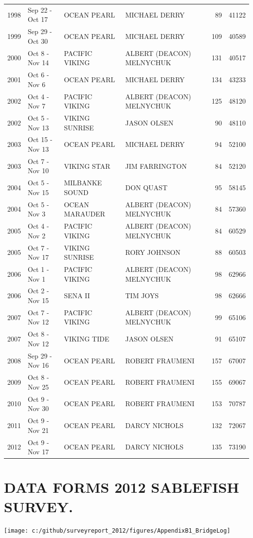 \documentclass[12pt]{article}\usepackage[]{graphicx}\usepackage[]{color}
\begin{document}
\begin{appendices}
\begin{longtable}{rlllrr}
1998 & Sep 22  - Oct 17 & OCEAN PEARL & MICHAEL DERRY & 89 & 41122\\
1999 & Sep 29  - Oct 30 & OCEAN PEARL & MICHAEL DERRY & 109 & 40589\\
2000 & Oct  8  - Nov 14 & PACIFIC VIKING & ALBERT (DEACON) MELNYCHUK & 131 & 40517\\
2001 & Oct  6  - Nov  6 & OCEAN PEARL & MICHAEL DERRY & 134 & 43233\\
2002 & Oct  4  - Nov  7 & PACIFIC VIKING & ALBERT (DEACON) MELNYCHUK & 125 & 48120\\
2002 & Oct  5  - Nov 13 & VIKING SUNRISE & JASON OLSEN & 90 & 48110\\
2003 & Oct 15  - Nov 13 & OCEAN PEARL & MICHAEL DERRY & 94 & 52100\\
2003 & Oct  7  - Nov 10 & VIKING STAR & JIM FARRINGTON & 84 & 52120\\
2004 & Oct  5  - Nov 15 & MILBANKE SOUND & DON QUAST & 95 & 58145\\
2004 & Oct  5  - Nov  3 & OCEAN MARAUDER & ALBERT (DEACON) MELNYCHUK & 84 & 57360\\
2005 & Oct  4  - Nov  2 & PACIFIC VIKING & ALBERT (DEACON) MELNYCHUK & 84 & 60529\\
2005 & Oct  7  - Nov 17 & VIKING SUNRISE & RORY JOHNSON & 88 & 60503\\
2006 & Oct  1  - Nov  1 & PACIFIC VIKING & ALBERT (DEACON) MELNYCHUK & 98 & 62966\\
2006 & Oct  2  - Nov 15 & SENA II & TIM JOYS & 98 & 62666\\
2007 & Oct  7  - Nov 12 & PACIFIC VIKING & ALBERT (DEACON) MELNYCHUK & 99 & 65106\\
2007 & Oct  8  - Nov 12 & VIKING TIDE & JASON OLSEN & 91 & 65107\\
2008 & Sep 29  - Nov 16 & OCEAN PEARL & ROBERT FRAUMENI & 157 & 67007\\
2009 & Oct  8  - Nov 25 & OCEAN PEARL & ROBERT FRAUMENI & 155 & 69067\\
2010 & Oct  9  - Nov 30 & OCEAN PEARL & ROBERT FRAUMENI & 153 & 70787\\
2011 & Oct  9  - Nov 21 & OCEAN PEARL & DARCY NICHOLS & 132 & 72067\\
2012 & Oct  9  - Nov 17 & OCEAN PEARL & DARCY NICHOLS & 135 & 73190\\
\bottomrule
\end{longtable}
\endgroup{}

\clearpage

\section{DATA FORMS 2012 SABLEFISH SURVEY.}
\label{app:second-appendix}
\begin{center}\texttt{[image: c:/github/surveyreport\_2012/figures/AppendixB1\_BridgeLog]} \end{center}


\end{appendices}
\end{document}
